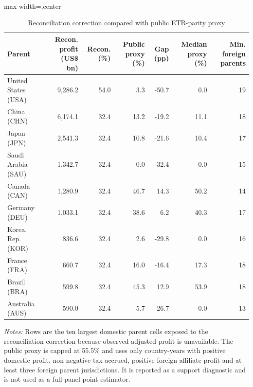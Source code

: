 \begin{table}[H]
\centering
\scriptsize
\caption{Reconciliation correction compared with public ETR-parity proxy}
\label{tab:app_profit_correction_benchmark_comparison}
\begin{adjustbox}{max width=\textwidth,center}
\begin{tabular}{@{}lrrrrrr@{}}
\toprule
Parent & Recon. profit (US\$ bn) & Recon. (\%) & Public proxy (\%) & Gap (pp) & Median proxy (\%) & Min. foreign parents \\
\midrule
United States (USA) & 9,286.2 & 54.0 &  3.3 & -50.7 &  0.0 & 19 \\
China (CHN) & 6,174.1 & 32.4 & 13.2 & -19.2 & 11.1 & 18 \\
Japan (JPN) & 2,541.3 & 32.4 & 10.8 & -21.6 & 10.4 & 17 \\
Saudi Arabia (SAU) & 1,342.7 & 32.4 &  0.0 & -32.4 &  0.0 & 15 \\
Canada (CAN) & 1,280.9 & 32.4 & 46.7 &  14.3 & 50.2 & 14 \\
Germany (DEU) & 1,033.1 & 32.4 & 38.6 &   6.2 & 40.3 & 17 \\
Korea, Rep. (KOR) &   836.6 & 32.4 &  2.6 & -29.8 &  0.0 & 16 \\
France (FRA) &   660.7 & 32.4 & 16.0 & -16.4 & 17.3 & 18 \\
Brazil (BRA) &   599.8 & 32.4 & 45.3 &  12.9 & 53.9 & 18 \\
Australia (AUS) &   590.0 & 32.4 &  5.7 & -26.7 &  0.0 & 13 \\
\bottomrule
\end{tabular}
\end{adjustbox}

\vspace{0.5em}
\begin{minipage}{0.96\textwidth}
\footnotesize\raggedright \textit{Notes:} Rows are the ten largest domestic parent cells exposed to the reconciliation correction because observed adjusted profit is unavailable. The public proxy is capped at 55.5\% and uses only country-years with positive domestic profit, non-negative tax accrued, positive foreign-affiliate profit and at least three foreign parent jurisdictions. It is reported as a support diagnostic and is not used as a full-panel point estimator.
\end{minipage}
\end{table}

